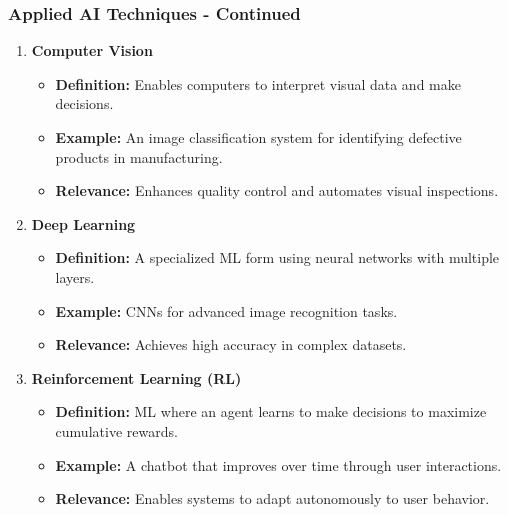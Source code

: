 \documentclass[aspectratio=169]{beamer}
\begin{document}
\begin{frame}[fragile]
    \frametitle{Applied AI Techniques - Continued}
    \begin{enumerate}[resume]
        \item \textbf{Computer Vision}
        \begin{itemize}
            \item \textbf{Definition:} Enables computers to interpret visual data and make decisions.
            \item \textbf{Example:} An image classification system for identifying defective products in manufacturing.
            \item \textbf{Relevance:} Enhances quality control and automates visual inspections.
        \end{itemize}

        \item \textbf{Deep Learning}
        \begin{itemize}
            \item \textbf{Definition:} A specialized ML form using neural networks with multiple layers.
            \item \textbf{Example:} CNNs for advanced image recognition tasks.
            \item \textbf{Relevance:} Achieves high accuracy in complex datasets.
        \end{itemize}

        \item \textbf{Reinforcement Learning (RL)}
        \begin{itemize}
            \item \textbf{Definition:} ML where an agent learns to make decisions to maximize cumulative rewards.
            \item \textbf{Example:} A chatbot that improves over time through user interactions.
            \item \textbf{Relevance:} Enables systems to adapt autonomously to user behavior.
        \end{itemize}
    \end{enumerate}
\end{frame}
\end{document}
